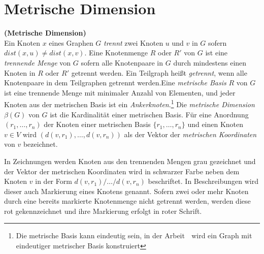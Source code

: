\newpage
\section{Metrische Dimension}
\label{MDT}
\begin{defi}{\textbf{(Metrische Dimension)}}\\
Ein Knoten $x$ eines Graphen $G$ \emph{trennt} zwei Knoten $u$ und $v$ in $G$ sofern $dist(x, u) \neq dist(x, v)$. Eine Knotenmenge $R$ oder $R'$ von $G$ ist eine \emph{trennende Menge} von $G$ sofern alle Knotenpaare in $G$ durch mindestens einen Knoten in $R$ oder $R'$ getrennt werden. Ein Teilgraph heißt \emph{getrennt}, wenn alle Knotenpaare in dem Teilgraphen getrennt werden.\newline \newline Eine \emph{metrische Basis} $R$ von $G$ ist eine trennende Menge mit minimaler Anzahl von Elementen, und jeder Knoten aus der metrischen Basis ist ein \emph{Ankerknoten}.\footnote{Die metrische Basis kann eindeutig sein, in der Arbeit \grqq$\;$\cite{bases} wird ein Graph mit eindeutiger metrischer Basis konstruiert} \newline\newline %
Die \emph{metrische Dimension $\beta(G)$} von $G$ ist die Kardinalität einer metrischen Basis. Für eine Anordnung $(r_1,\ldots,r_n)$ der Knoten einer metrischen Basis $\{r_1,\ldots,r_n\}$ und einen Knoten $v \in V$ wird $(d(v, r_1 ), \ldots , d(v, r_n ))$ als der Vektor der \emph{metrischen Koordinaten} von $v$ bezeichnet.
\end{defi}
\begin{bem}
In Zeichnungen werden Knoten aus den trennenden Mengen grau gezeichnet und der Vektor der metrischen Koordinaten wird in schwarzer Farbe neben dem Knoten $v$ in der Form $d(v, r_1 )/ \ldots / d(v, r_n )$ beschriftet. In Beschreibungen wird dieser auch Markierung eines Knotens genannt. Sofern zwei oder mehr Knoten durch eine bereits markierte Knotenmenge nicht getrennt werden, werden diese rot gekennzeichnet und ihre Markierung erfolgt in roter Schrift. 
\end{bem}
